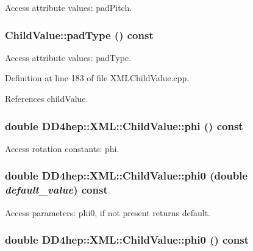 Access attribute values: padPitch. \hypertarget{struct_d_d4hep_1_1_x_m_l_1_1_child_value_a08dd54d57ee3653f62d1d8286386bbf2}{
\subsubsection[{padType}]{ ChildValue::padType () const}}
\label{struct_d_d4hep_1_1_x_m_l_1_1_child_value_a08dd54d57ee3653f62d1d8286386bbf2}


Access attribute values: padType. 

Definition at line 183 of file XMLChildValue.cpp.

References childValue.\hypertarget{struct_d_d4hep_1_1_x_m_l_1_1_child_value_a53f99a782b104474a42603a3e6175cfb}{
\subsubsection[{phi}]{\setlength{\rightskip}{0pt plus 5cm}double DD4hep::XML::ChildValue::phi () const}}
\label{struct_d_d4hep_1_1_x_m_l_1_1_child_value_a53f99a782b104474a42603a3e6175cfb}


Access rotation constants: phi. \hypertarget{struct_d_d4hep_1_1_x_m_l_1_1_child_value_a85b2176e59268e8ca1254a07b76ee88f}{
\subsubsection[{phi0}]{\setlength{\rightskip}{0pt plus 5cm}double DD4hep::XML::ChildValue::phi0 (double {\em default\_\-value}) const}}
\label{struct_d_d4hep_1_1_x_m_l_1_1_child_value_a85b2176e59268e8ca1254a07b76ee88f}


Access parameters: phi0, if not present returns default. \hypertarget{struct_d_d4hep_1_1_x_m_l_1_1_child_value_a7b7e5da8a71f3b7fb51f0b5322d4af23}{
\subsubsection[{phi0}]{\setlength{\rightskip}{0pt plus 5cm}double DD4hep::XML::ChildValue::phi0 () const}}
\label{struct_d_d4hep_1_1_x_m_l_1_1_child_value_a7b7e5da8a71f3b7fb51f0b5322d4af23}


